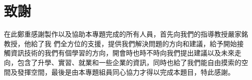 \chapter*{致謝}
\renewcommand{\baselinestretch}{1} %
\twelve 在此鄭重感謝製作以及協助本專題完成的所有人員，首先向我們的指導教授嚴家銘教授，他給了我
們全方位的支援，提供我們解決問題的方向和建議，給予開始接觸資訊技術的我們有個學習的方向，開會時也時不時向我們提出建議以及未來走向，包含了升學、實習、就業和一些企業的資訊，同時也給了我們能自由摸索的空間及發揮空間，最後是由本專題組員同心協力才得以完成本題目，特此感謝。
\par